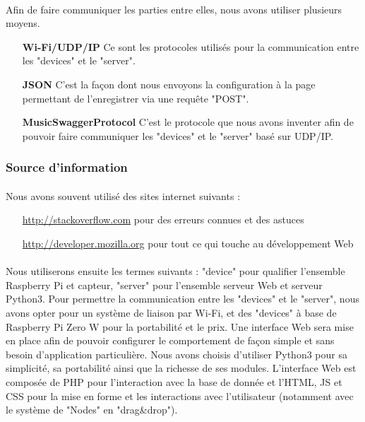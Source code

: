 \documentclass[12pt]{article}
\begin{document}
	\paragraph{}
	Afin de faire communiquer les parties entre elles, nous avons utiliser plusieurs moyens.
	\begin{itemize}
		\item[\textbf{Wi-Fi/UDP/IP}] Ce sont les protocoles utilisés pour la communication entre les "devices" et le "server".
		\item[\textbf{JSON}] C'est la façon dont nous envoyons la configuration à la page permettant de l'enregistrer via une requête "POST".
		\item[\textbf{MusicSwaggerProtocol}] C'est le protocole que nous avons inventer afin de pouvoir faire communiquer les "devices" et le "server" basé sur UDP/IP.
	\end{itemize}
	\subsubsection{Source d'information}
	\paragraph{}
	Nous avons souvent utilisé des sites internet suivants :
	\begin{itemize}
		\item[\url{http://stackoverflow.com}] pour des erreurs connues et des astuces
		\item[\url{http://developer.mozilla.org}] pour tout ce qui touche au développement Web
	\end{itemize}

	\paragraph{}
	Nous utiliserons ensuite les termes suivants : "device" pour qualifier l'ensemble Raspberry Pi et capteur, "server" pour l'ensemble serveur Web et serveur Python3.
	Pour permettre la communication entre les "devices" et le "server", nous avons opter pour un système de liaison par Wi-Fi, et des "devices" à base de Raspberry Pi Zero W pour la portabilité et le prix. Une interface Web sera mise en place afin de pouvoir configurer le comportement de façon simple et sans besoin d'application particulière. Nous avons choisis d'utiliser Python3 pour sa simplicité, sa portabilité ainsi que la richesse de ses modules. L'interface Web est composée de PHP pour l'interaction avec la base de donnée et l'HTML, JS et CSS pour la mise en forme et les interactions avec l'utilisateur (notamment avec le système de "Nodes" en "drag\&drop").
\end{document}
